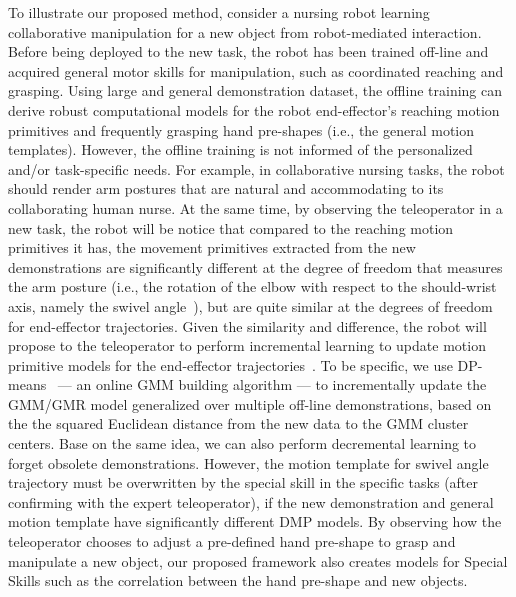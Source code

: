 \documentclass[letterpaper, 11 pt, onecolumn]{article}
\begin{document}
To illustrate our proposed method, consider a nursing robot learning collaborative manipulation for a new object from robot-mediated interaction. Before being deployed to the new task, the robot has been trained off-line and acquired general motor skills for manipulation, such as coordinated reaching and grasping. Using large and general demonstration dataset, the offline training can derive robust computational models for the robot end-effector's reaching motion primitives and frequently grasping hand pre-shapes (i.e., the general motion templates). However, the offline training is not informed of the personalized and/or task-specific needs. For example, in collaborative nursing tasks, the robot should render  arm postures that are natural and accommodating to its collaborating human nurse. At the same time, by observing the teleoperator in a new task, the robot will be notice that compared to the reaching motion primitives it has, the movement primitives extracted from the new demonstrations are significantly different at the degree of freedom that measures the arm posture (i.e., the rotation of the elbow with respect to the should-wrist axis, namely the swivel angle~\cite{Tolani_Badler:96}), but are quite similar at the degrees of freedom for end-effector trajectories. Given the similarity and difference, the robot will propose to the teleoperator to perform incremental learning to update motion primitive models for the end-effector trajectories~\cite{havoutis2016online}. To be specific, we use DP-means~\cite{kulis2011revisiting} --- an online GMM building algorithm --- to incrementally update the GMM/GMR model generalized over multiple off-line demonstrations, based on the the squared Euclidean distance from the new data to the GMM cluster centers. Base on the same idea, we can also perform decremental learning to forget obsolete demonstrations. However, the motion template for swivel angle trajectory must be overwritten by the special skill in the specific tasks (after confirming with the expert teleoperator), if the new demonstration and general motion template have significantly different DMP models. By observing how the teleoperator chooses to adjust a pre-defined hand pre-shape to grasp and manipulate a new object, our proposed framework also creates models for Special Skills such as the correlation between the hand pre-shape and new objects.  

\end{document}

